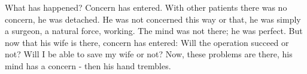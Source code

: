 \english
What has happened? Concern has entered. With other patients there was no concern, he was detached. He was not concerned this way or that, he was simply a surgeon, a natural force, working. The mind was not there; he was perfect. But now that his wife is there, concern has entered: Will the operation succeed or not? Will I be able to save my wife or not? Now, these problems are there, his mind has a concern - then his hand trembles.
